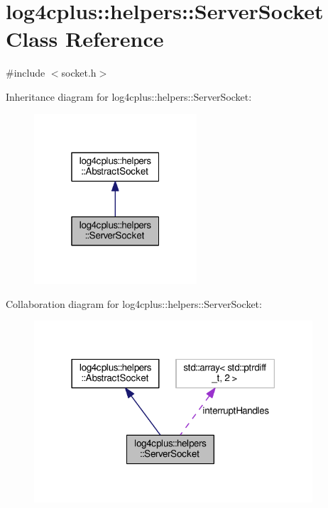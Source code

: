 \hypertarget{classlog4cplus_1_1helpers_1_1ServerSocket}{\section{log4cplus\-:\-:helpers\-:\-:Server\-Socket Class Reference}
\label{classlog4cplus_1_1helpers_1_1ServerSocket}
}


{\ttfamily \#include $<$socket.\-h$>$}



Inheritance diagram for log4cplus\-:\-:helpers\-:\-:Server\-Socket\-:
\nopagebreak
\begin{figure}[H]
\begin{center}
\leavevmode
\includegraphics[width=172pt]{classlog4cplus_1_1helpers_1_1ServerSocket__inherit__graph}
\end{center}
\end{figure}


Collaboration diagram for log4cplus\-:\-:helpers\-:\-:Server\-Socket\-:
\nopagebreak
\begin{figure}[H]
\begin{center}
\leavevmode
\includegraphics[width=294pt]{classlog4cplus_1_1helpers_1_1ServerSocket__coll__graph}
\end{center}
\end{figure}
